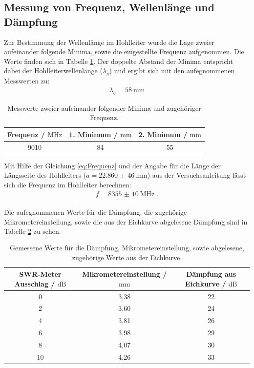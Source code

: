 \subsection{Messung von Frequenz, Wellenlänge und Dämpfung}
Zur Bestimmung der Wellenlänge im Hohlleiter wurde die Lage zweier aufeinander
folgende Minima, sowie die eingestellte Frequenz aufgenommen. Die Werte finden
sich in Tabelle \ref{tab:Frequenz}. Der doppelte Abstand der Minima entspricht dabei
der Hohlleiterwellenlänge ($\lambda_{g}$) und ergibt sich mit den aufegnommenen Messwerten zu:
\begin{align*}
    \lambda_{g} = \SI{58}{\mm}
\end{align*}
\begin{table}
    \centering
    \begin{tabular}{c c c}
        \toprule
        {Frequenz / $\si{\MHz}$ } & {1. Minimum / $\si{\mm}$ } & { 2. Minimum / $\si{\mm}$} \\
        \midrule
        9010   &  84  &  55  \\
        \bottomrule
    \end{tabular}
    \caption{Messwerte zweier aufeinander folgender Minima und zugehöriger Frequenz.}
    \label{tab:Frequenz}
\end{table}
Mit Hilfe der Gleichung \ref{eq:Frequenz} und der Angabe für die Länge der Längsseite
des Hohlleiters ($a = \SI{22,860(46)}{\mm}$) aus der Versuchsanleitung \cite{Q1} lässt
sich die Frequenz im Hohlleiter berechnen:
\begin{align*}
    f = \SI{8355(10)}{\MHz} \; .
\end{align*}
\\
Die aufegnommenen Werte für die Dämpfung, die zugehörige Mikrometereinstellung,
sowie die aus der Eichkurve abgelesene Dämpfung sind in Tabelle \ref{tab:Daempfung}
zu sehen.
\FloatBarrier
\begin{table}
    \centering
    \begin{tabular}{c c c }
        \toprule
        {SWR-Meter Ausschlag / $\si{\dB}$ } & { Mikrometereinstellung / $\si{\mm}$} & {Dämpfung aus Eichkurve / $\si{\dB}$ } \\
        \midrule
         0       &       3,38        &       22      \\
         2       &       3,60        &       24      \\
         4       &       3,81        &       26      \\
         6       &       3,98        &       29      \\
         8       &       4,07        &       30      \\
        10       &       4,26        &       33      \\
        \bottomrule
    \end{tabular}
    \caption{Gemessene Werte für die Dämpfung, Mikrometereinstellung, sowie abgelesene, zugehörige Werte aus der Eichkurve.}
    \label{tab:Daempfung}
\end{table}

